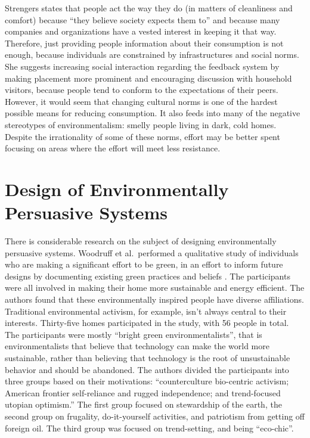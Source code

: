 Strengers states that people act the way they do (in matters of cleanliness and comfort) because ``they believe society expects them to'' and because many companies and organizations have a vested interest in keeping it that way. Therefore, just providing people information about their consumption is not enough, because individuals are constrained by infrastructures and social norms. She suggests increasing social interaction regarding the feedback system by making placement more prominent and encouraging discussion with household visitors, because people tend to conform to the expectations of their peers.
However, it would seem that changing cultural norms is one of the hardest possible means for reducing consumption. It also feeds into many of the negative stereotypes of environmentalism: smelly people living in dark, cold homes. Despite the irrationality of some of these norms, effort may be better spent focusing on areas where the effort will meet less resistance.


\section{Design of Environmentally Persuasive Systems}

There is considerable research on the subject of designing environmentally persuasive systems. Woodruff et al.\ performed a qualitative study of individuals who are making a significant effort to be green, in an effort to inform future designs by documenting existing green practices and beliefs \cite{Woodruff2008-bright-green}. The participants were all involved in making their home more sustainable and energy efficient. The authors found that these environmentally inspired people have diverse affiliations. Traditional environmental activism, for example, isn't always central to their interests. Thirty-five homes participated in the study, with 56 people in total. The participants were mostly ``bright green environmentalists'', that is environmentalists that believe that technology can make the world more sustainable, rather than believing that technology is the root of unsustainable behavior and should be abandoned. The authors divided the participants into three groups based on their motivations: ``counterculture bio-centric activism; American frontier self-reliance and rugged independence; and trend-focused utopian optimism.'' The first group focused on stewardship of the earth, the second group on frugality, do-it-yourself activities, and patriotism from getting off foreign oil. The third group was focused on trend-setting, and being ``eco-chic''.

